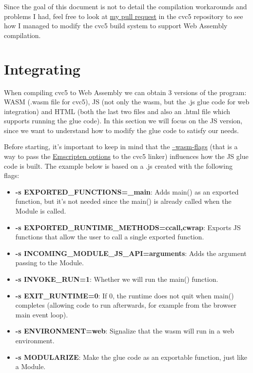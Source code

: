 \documentclass[12pt, a4paper]{article}
\begin{document}
Since the goal of this document is not to detail the compilation workarounds and
problems I had, feel free to look at
\href{https://github.com/cvc5/cvc5/pull/9006}{my pull request} in the cvc5
repository to see how I managed to modify the cvc5 build system to support Web
Assembly compilation.

\section{Integrating}

When compiling cvc5 to Web Assembly we can obtain 3 versions of the program: WASM (.wasm file for cvc5), JS (not only the wasm, but the .js glue code for web integration) and HTML (both the last two files and also an .html file which supports running the glue code). In this section we will focus on the JS version, since we want to understand how to modify the glue code to satisfy our needs.

Before starting, it's important to keep in mind that the
\href{https://github.com/cvc5/cvc5/blob/main/configure.sh}{--wasm-flags} (that
is a way to pass the
\href{https://github.com/emscripten-core/emscripten/blob/main/src/settings.js}{Emscripten
  options} to the cvc5 linker) influences how the JS glue code is built. The
example below is based on a .js created with the following flags:
\begin{itemize}
    \item \textbf{-s EXPORTED\_FUNCTIONS=\_main}: Adds \textsf{main()} as an
    exported function, but it's not needed since the \textsf{main()} is already
    called when the Module is called.
    \item \textbf{-s EXPORTED\_RUNTIME\_METHODS=ccall,cwrap}: Exports JS functions that allow the user to call a single exported function.
    \item \textbf{-s INCOMING\_MODULE\_JS\_API=arguments}: Adds the argument passing to the Module.
    \item \textbf{-s INVOKE\_RUN=1}: Whether we will run the \textsf{main()} function.
    \item \textbf{-s EXIT\_RUNTIME=0}: If 0, the runtime does not quit when
    \textsf{main()} completes (allowing code to run afterwards, for example from
    the browser main event loop).
    \item \textbf{-s ENVIRONMENT=web}: Signalize that the wasm will run in a web environment.
    \item \textbf{-s MODULARIZE}: Make the glue code as an exportable function, just like a Module.
\end{itemize}
\end{document}
